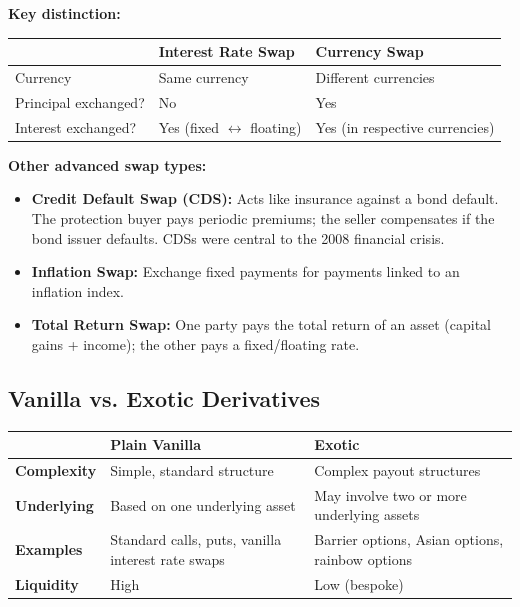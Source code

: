 \documentclass[12pt,openany]{book}
\begin{document}
\textbf{Key distinction:}

\begin{center}
\small
\renewcommand{\arraystretch}{1.2}
\begin{tabular}{|L{0.20\textwidth}|L{0.28\textwidth}|L{0.42\textwidth}|}
\hline
 & \textbf{Interest Rate Swap} & \textbf{Currency Swap} \\ \hline
Currency & Same currency & Different currencies \\ \hline
Principal exchanged? & No & Yes \\ \hline
Interest exchanged? & Yes (fixed $\leftrightarrow$ floating) & Yes (in respective currencies) \\ \hline
\end{tabular}
\end{center}

\textbf{Other advanced swap types:}
\begin{itemize}[leftmargin=*]
    \item \textbf{Credit Default Swap (CDS):} Acts like insurance against a bond default. The protection buyer pays periodic premiums; the seller compensates if the bond issuer defaults. CDSs were central to the 2008 financial crisis.
    \item \textbf{Inflation Swap:} Exchange fixed payments for payments linked to an inflation index.
    \item \textbf{Total Return Swap:} One party pays the total return of an asset (capital gains + income); the other pays a fixed/floating rate.
\end{itemize}

\subsection{Vanilla vs. Exotic Derivatives}

\begin{center}
\small
\renewcommand{\arraystretch}{1.2}
\begin{tabular}{|L{0.20\textwidth}|L{0.28\textwidth}|L{0.42\textwidth}|}
\hline
 & \textbf{Plain Vanilla} & \textbf{Exotic} \\ \hline
\textbf{Complexity} & Simple, standard structure & Complex payout structures \\ \hline
\textbf{Underlying} & Based on one underlying asset & May involve two or more underlying assets \\ \hline
\textbf{Examples} & Standard calls, puts, vanilla interest rate swaps & Barrier options, Asian options, rainbow options \\ \hline
\textbf{Liquidity} & High & Low (bespoke) \\ \hline
\end{tabular}
\end{center}
\end{document}
